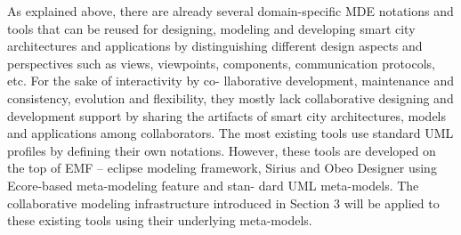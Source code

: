 As explained above, there are already several domain-specific MDE notations and tools that can be reused for designing, modeling and developing smart city architectures and applications by distinguishing different design aspects and perspectives such as views, viewpoints, components, communication protocols, etc. For the sake of interactivity by co- llaborative development, maintenance and consistency, evolution and flexibility, they mostly lack collaborative designing and development support by sharing the artifacts of smart city architectures, models and applications among collaborators. The most existing tools use standard UML profiles by defining their own notations. However, these tools are developed on the top of EMF – eclipse modeling framework, Sirius and Obeo Designer using Ecore-based meta-modeling feature and stan- dard UML meta-models. The collaborative modeling infrastructure introduced in Section 3 will be applied to these existing tools using their underlying meta-models.